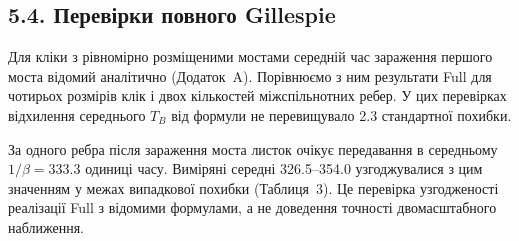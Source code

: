 \documentclass[11pt,a4paper]{article}
\newcommand{\Full}{\textnormal{Full}}
\begin{document}
\subsection*{5.4. Перевірки повного Gillespie}
Для кліки з рівномірно розміщеними мостами середній час зараження першого моста відомий аналітично (Додаток~A). Порівнюємо з ним результати \Full{} для чотирьох розмірів клік і двох кількостей міжспільнотних ребер. У цих перевірках відхилення середнього $T_B$ від формули не перевищувало 2.3 стандартної похибки.
\par За одного ребра після зараження моста листок очікує передавання в середньому $1/\beta=333.3$ одиниці часу. Виміряні середні 326.5--354.0 узгоджувалися з цим значенням у межах випадкової похибки (Таблиця~3). Це перевірка узгодженості реалізації \Full{} з відомими формулами, а не доведення точності двомасштабного наближення.
\clearpage
\end{document}
